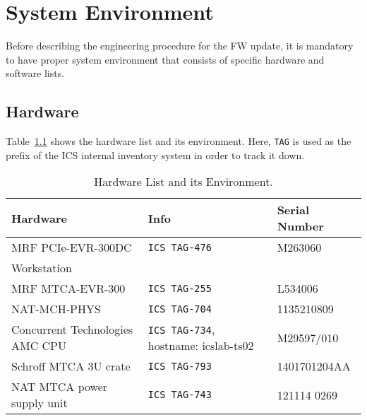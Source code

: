 \documentclass[11pt
  , a4paper
  , article
  , oneside
  , showtrims
]{memoir}
\begin{document}
\clearpage

\chapter{System Environment}
Before describing the engineering procedure for the FW update, it is mandatory to have proper system environment that consists of specific hardware and software lists.


\section{Hardware}
Table~\ref{table:hwlist} shows the hardware list and its environment. Here, \texttt{TAG} is used as the prefix of the ICS internal inventory system in order to track it down.
\begin{table}[!hb]
  \centering
  \begin{tabular}{l|l|l}
    \toprule
    Hardware                        & Info                                        & Serial Number \\\midrule
    MRF PCIe-EVR-300DC              & \texttt{ICS TAG-476}                        & M263060       \\\midrule
    Workstation                     &                                             &               \\\midrule
    MRF MTCA-EVR-300                & \texttt{ICS TAG-255}                        & L534006       \\\midrule
    NAT-MCH-PHYS                    & \texttt{ICS TAG-704}                        & 1135210809    \\\midrule
    Concurrent Technologies AMC CPU & \texttt{ICS TAG-734}, hostname: icslab-ts02 & M29597/010    \\\midrule
    Schroff MTCA 3U crate           & \texttt{ICS TAG-793}                        & 1401701204AA  \\\midrule
    NAT MTCA power supply unit      & \texttt{ICS TAG-743}                        & 121114 0269   \\\bottomrule
  \end{tabular}
  \caption[]{Hardware List and its Environment.}
  \label{table:hwlist}
\end{table}

\end{document}

